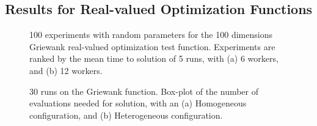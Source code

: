 \documentclass[graybox]{svmult}
\begin{document}
\subsection{Results for Real-valued Optimization Functions}
%
\begin{figure}[t]
    \centering

    \caption{100 experiments with random parameters for the 100 dimensions Griewank
    real-valued optimization test function. Experiments are ranked by
    the mean time to solution of 5 runs, with (a) 6 workers, and (b) 12 workers.}
    \label{fig:griewank}
\end{figure}
%
\begin{figure}[t]
    \centering
      \caption{ 30 runs on the Griewank function. Box-plot of the number of evaluations needed for solution,
                 with an (a) Homogeneous configuration, and (b) Heterogeneous configuration.}
    \label{fig:griewank-evals}
\end{figure}
\end{document}
